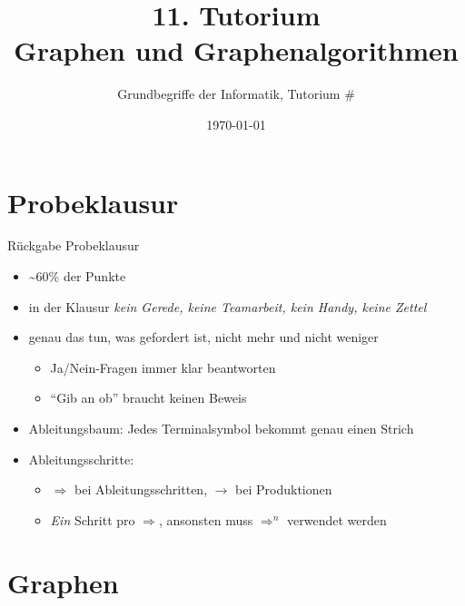 




\title[Graphen]{11. Tutorium\\ Graphen und Graphenalgorithmen}
\subtitle{Grundbegriffe der Informatik, Tutorium \#\mytutnumber}
\date{\today}

\usetikzlibrary{matrix}
\usetikzlibrary{arrows.meta}
\usetikzlibrary{automata}
\usetikzlibrary{tikzmark}


\titleframe
\roadmap


\section{Probeklausur}
\begin{frame}{Rückgabe Probeklausur}
	\begin{itemize}
		\item \textasciitilde 60\% der Punkte
		\item in der Klausur \emph{kein Gerede, keine Teamarbeit, kein Handy, keine Zettel}
		\item genau das tun, was gefordert ist, nicht mehr und nicht weniger
		\begin{itemize}
			\item Ja/Nein-Fragen immer klar beantworten
			\item \enquote{Gib an ob} braucht keinen Beweis
		\end{itemize}
		\item Ableitungsbaum: Jedes Terminalsymbol bekommt genau einen Strich
		\item Ableitungsschritte:
		\begin{itemize}
			\item $\Rightarrow$ bei Ableitungsschritten, $\rightarrow$ bei Produktionen
			\item \emph{Ein} Schritt pro $\Rightarrow$, ansonsten muss $\Rightarrow^n$ verwendet werden
		\end{itemize}
	\end{itemize}
	
\end{frame}


\section{Graphen}

